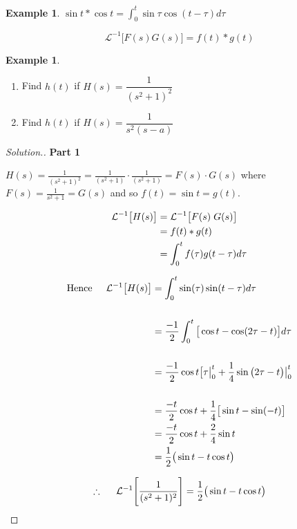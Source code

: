 \documentclass[11pt,a4paper]{article}
\theoremstyle{definition}
\newtheorem{exa}[thm]{Example}
\newenvironment{solution}
  {\renewcommand{\qedsymbol}{}\begin{proof}[\textit{Solution}.]}
  {\end{proof}}
\newcommand{\subhead}[1]{%
  \par\medskip\noindent\textbf{#1}\par\nobreak\smallskip}
\begin{document}
\begin{exa}


$\displaystyle{\sin t * \cos t = \int^t_0 \sin \tau \cos (t - \tau) d\tau}$


$$\mathcal{L}^{-1}\big[F(s) G(s)\big] = f(t) * g(t)$$
\end{exa}


\begin{exa}
\begin{enumerate}
\item Find $h(t)$ if $H(s) = \dfrac{1}{(s^2+1)^2}$
\item Find $h(t)$ if $H(s) = \dfrac{1}{s^2 (s-a)}$
\end{enumerate}
\end{exa}

\begin{solution}
\subhead{Part 1}
$\displaystyle{H(s) = \frac{1}{(s^2 + 1)^2} = \frac{1}{(s^2 +  1)}\cdot \frac{1}{(s^2 + 1)} = F(s)\cdot G(s)}$
where $\displaystyle{F(s) = \frac{1}{s^2 + 1} = G(s)}$ and so $f(t) = \sin t = g(t)$.

\begin{align*}
\mathcal{L}^{-1}\big[H(s)\big] & = \mathcal{L}^{-1}\big[F(s)\hspace{0.1cm} G(s)\big]\\
& = f(t)*g(t)\\
& = \int^t_0 f(\tau) g(t-\tau) d\tau
\end{align*}

\begin{align*}
\text{Hence}\hspace{0.5cm} \mathcal{L}^{-1}\big[H(s)\big] & = \int^t_0\sin (\tau) \sin (t-\tau) d\tau\\\\
& = \frac{-1}{2}\int^t_0 \big[\cos t - \cos (2\tau -t)\big]d\tau\\\\
& = \frac{-1}{2} \cos t\big[\tau\big|^t_0 +\frac{1}{4} \sin \big(2\tau -t\big)\big|^t_0\\\\
& = \frac{-t}{2}\cos t+ \frac{1}{4}\big[\sin t- \sin (-t)\big]\\
& = \frac{-t}{2}\cos t + \frac{2}{4}\sin t\\
& = \frac{1}{2}\big(\sin t - t\cos t\big)
\end{align*}

$$\therefore\hspace{0.5cm} \mathcal{L}^{-1}\Bigg[\dfrac{1}{(s^2 + 1)^2}\Bigg] = \frac{1}{2}\big(\sin t - t\cos t\big)$$


\end{solution}
\end{document}
